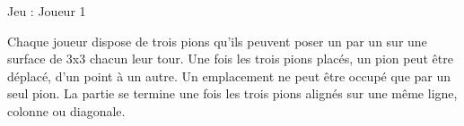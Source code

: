 Jeu \-: Joueur 1

Chaque joueur dispose de trois pions qu'ils peuvent poser un par un sur une surface de 3x3 chacun leur tour. Une fois les trois pions placés, un pion peut être déplacé, d'un point à un autre. Un emplacement ne peut être occupé que par un seul pion. La partie se termine une fois les trois pions alignés sur une même ligne, colonne ou diagonale. 